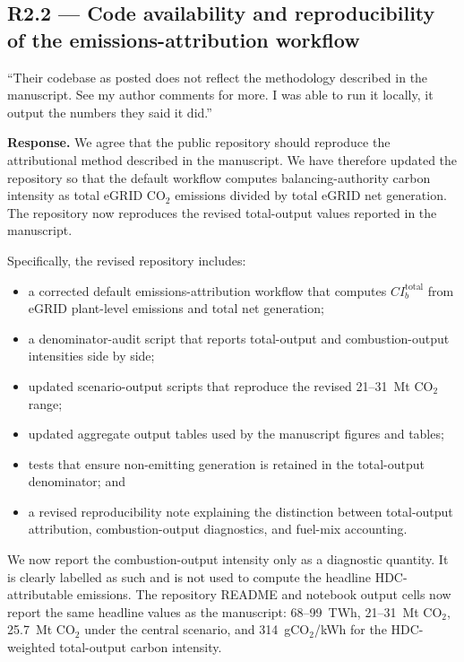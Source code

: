 \documentclass[11pt]{article}
\newenvironment{revquote}{%
  \begin{mdframed}[
    leftmargin=0.5em,
    rightmargin=0.5em,
    linewidth=0pt,
    backgroundcolor=gray!8,
    skipabove=0.5em,
    skipbelow=0.5em,
    innertopmargin=0.6em,
    innerbottommargin=0.6em,
    innerleftmargin=0.8em,
    innerrightmargin=0.8em
  ]%
  \itshape%
}{%
  \end{mdframed}%
}
\begin{document}
\subsection*{R2.2 --- Code availability and reproducibility of the emissions-attribution workflow}

\begin{revquote}
``Their codebase as posted does not reflect the methodology described in the manuscript. See my author comments for more. I was able to run it locally, it output the numbers they said it did.''
\end{revquote}

\textbf{Response.} We agree that the public repository should reproduce the attributional method described in the manuscript. We have therefore updated the repository so that the default workflow computes balancing-authority carbon intensity as total eGRID CO$_2$ emissions divided by total eGRID net generation. The repository now reproduces the revised total-output values reported in the manuscript.

Specifically, the revised repository includes:

\begin{itemize}
    \item a corrected default emissions-attribution workflow that computes $CI_b^{\mathrm{total}}$ from eGRID plant-level emissions and total net generation;
    \item a denominator-audit script that reports total-output and combustion-output intensities side by side;
    \item updated scenario-output scripts that reproduce the revised 21--31~Mt CO$_2$ range;
    \item updated aggregate output tables used by the manuscript figures and tables;
    \item tests that ensure non-emitting generation is retained in the total-output denominator; and
    \item a revised reproducibility note explaining the distinction between total-output attribution, combustion-output diagnostics, and fuel-mix accounting.
\end{itemize}

We now report the combustion-output intensity only as a diagnostic quantity. It is clearly labelled as such and is not used to compute the headline HDC-attributable emissions. The repository README and notebook output cells now report the same headline values as the manuscript: 68--99~TWh, 21--31~Mt CO$_2$, 25.7~Mt CO$_2$ under the central scenario, and 314~gCO$_2$/kWh for the HDC-weighted total-output carbon intensity.
\end{document}
